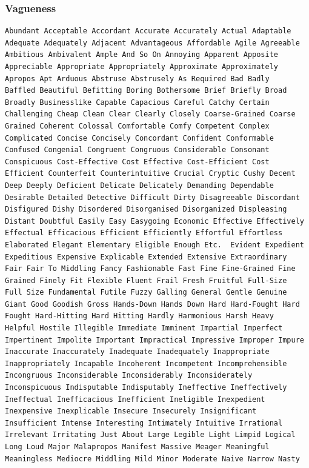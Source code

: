 \documentclass[12pt]{report}
\begin{document}
\subsubsection{Vagueness}
\begin{lstlisting}
Abundant Acceptable Accordant Accurate Accurately Actual Adaptable
Adequate Adequately Adjacent Advantageous Affordable Agile Agreeable
Ambitious Ambivalent Ample And So On Annoying Apparent Apposite
Appreciable Appropriate Appropriately Approximate Approximately
Apropos Apt Arduous Abstruse Abstrusely As Required Bad Badly
Baffled Beautiful Befitting Boring Bothersome Brief Briefly Broad
Broadly Businesslike Capable Capacious Careful Catchy Certain
Challenging Cheap Clean Clear Clearly Closely Coarse-Grained Coarse
Grained Coherent Colossal Comfortable Comfy Competent Complex
Complicated Concise Concisely Concordant Confident Conformable
Confused Congenial Congruent Congruous Considerable Consonant
Conspicuous Cost-Effective Cost Effective Cost-Efficient Cost
Efficient Counterfeit Counterintuitive Crucial Cryptic Cushy Decent
Deep Deeply Deficient Delicate Delicately Demanding Dependable
Desirable Detailed Detective Difficult Dirty Disagreeable Discordant
Disfigured Dishy Disordered Disorganised Disorganized Displeasing
Distant Doubtful Easily Easy Easygoing Economic Effective Effectively
Effectual Efficacious Efficient Efficiently Effortful Effortless
Elaborated Elegant Elementary Eligible Enough Etc.  Evident Expedient
Expeditious Expensive Explicable Extended Extensive Extraordinary
Fair Fair To Middling Fancy Fashionable Fast Fine Fine-Grained Fine
Grained Finely Fit Flexible Fluent Frail Fresh Fruitful Full-Size
Full Size Fundamental Futile Fuzzy Galling General Gentle Genuine
Giant Good Goodish Gross Hands-Down Hands Down Hard Hard-Fought Hard
Fought Hard-Hitting Hard Hitting Hardly Harmonious Harsh Heavy
Helpful Hostile Illegible Immediate Imminent Impartial Imperfect
Impertinent Impolite Important Impractical Impressive Improper Impure
Inaccurate Inaccurately Inadequate Inadequately Inappropriate
Inappropriately Incapable Incoherent Incompetent Incomprehensible
Incongruous Inconsiderable Inconsiderably Inconsiderately
Inconspicuous Indisputable Indisputably Ineffective Ineffectively
Ineffectual Inefficacious Inefficient Ineligible Inexpedient
Inexpensive Inexplicable Insecure Insecurely Insignificant
Insufficient Intense Interesting Intimately Intuitive Irrational
Irrelevant Irritating Just About Large Legible Light Limpid Logical
Long Loud Major Malapropos Manifest Massive Meager Meaningful
Meaningless Mediocre Middling Mild Minor Moderate Naive Narrow Nasty

\end{lstlisting}
\end{document}
